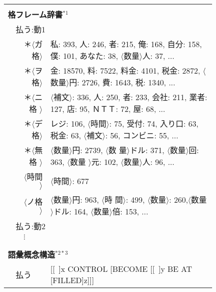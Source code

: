 \documentclass[japanese]{jnlp_1.2b}
\begin{document}
\begin{figure}[p]
  \setlength{\tabcolsep}{1.3mm}
  \begin{tabular}{llllllllllll}
   \hline\hline
   \vspace*{-2mm}& & & & & & & & & & &\\
   \multicolumn{12}{l}{\normalsize {\bf 格フレーム辞書}$^{*1}$}\\
   &\multicolumn{11}{l}{払う:動1}\\
   &&\multicolumn{2}{r}{＊$\langle$ガ格$\rangle$}&\multicolumn{8}{l}{私:
   393, 人: 246, 者: 215, 俺: 168, 自分: 158, 僕: 101, あなた: 38,
   $\langle$数量$\rangle$人: 37, ...}\\
   &&\multicolumn{2}{r}{＊$\langle$ヲ格$\rangle$}&\multicolumn{8}{l}{金:
   18570, 料: 7522, 料金: 4101, 税金: 2872, $\langle$数量$\rangle$円:
   2726, 費: 1643, 税: 1340, ...}\\
   &&\multicolumn{2}{r}{＊$\langle$ニ格
   $\rangle$}&\multicolumn{8}{l}{$\langle$補文$\rangle$: 336, 人: 250, 者:
   233, 会社: 211, 業者: 127, 店: 95, ＮＴＴ: 72, 屋: 68, ...}\\
   &&\multicolumn{2}{r}{＊$\langle$デ格$\rangle$}&\multicolumn{8}{l}{レジ:
   106, $\langle$時間$\rangle$: 75, 受付: 74, 入り口: 63, 税金: 63,
   $\langle$補文$\rangle$: 56, コンビニ: 55, ...}\\
   &&\multicolumn{2}{r}{＊$\langle$無格
   $\rangle$}&\multicolumn{8}{l}{$\langle$数量$\rangle$円: 2739, $\langle$数
   量$\rangle$ドル: 371, $\langle$数量$\rangle$回: 363, $\langle$数量
   $\rangle$元: 102, $\langle$数量$\rangle$人: 96, ...}\\
   &&\multicolumn{2}{r}{$\langle$時間
   $\rangle$}&\multicolumn{8}{l}{$\langle$時間$\rangle$: 677}\\
   &&\multicolumn{2}{r}{$\langle$ノ格
   $\rangle$}&\multicolumn{8}{l}{$\langle$数量$\rangle$円: 963, $\langle$時
   間$\rangle$: 499, $\langle$数量$\rangle$: 260,$\langle$数量$\rangle$ドル:
   164, $\langle$数量$\rangle$倍: 153, ...}\\
   &\multicolumn{11}{l}{払う:動2}\\
   &&\multicolumn{10}{l}{$\vdots$}\\
   \vspace*{-2mm}& & & & & & & & & & & \\ 
\hline
   \vspace*{-2mm}& & & & & & & & & & & \\
   \multicolumn{12}{l}{\normalsize {\bf 語彙概念構造}$^{*2 *3}$}\\
       &\multicolumn{3}{l}{払う}&\multicolumn{8}{l}{[[~]x CONTROL [BECOME [[~]y BE AT [FILLED]z]]]}\\

\end{tabular}
\end{figure}
\end{document}
